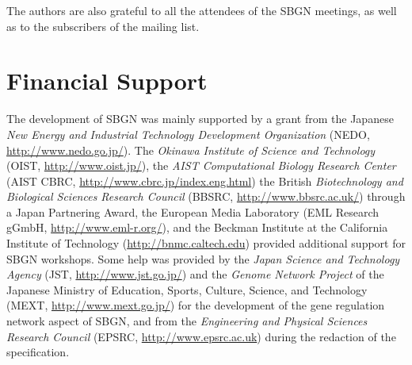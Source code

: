 The authors are also grateful to all the attendees of the SBGN meetings, as 
well as to the subscribers of the  mailing list.


\section{Financial Support}

The development of SBGN was mainly supported by a grant from the Japanese \emph{New Energy and Industrial Technology Development Organization} (NEDO, \url{http://www.nedo.go.jp/}).  The \emph{Okinawa Institute of Science and Technology} (OIST, \url{http://www.oist.jp/}), the \emph{AIST Computational Biology Research Center} (AIST CBRC, \url{http://www.cbrc.jp/index.eng.html}) the British \emph{Biotechnology and Biological Sciences Research Council} (BBSRC, \url{http://www.bbsrc.ac.uk/}) through a Japan Partnering Award, the European Media Laboratory (EML Research gGmbH, \url{http://www.eml-r.org/}), and the Beckman Institute at the California Institute of Technology (\url{http://bnmc.caltech.edu}) provided additional support for SBGN workshops.  Some help was provided by the \emph{Japan Science and Technology Agency} (JST, \url{http://www.jst.go.jp/}) and the \emph{Genome Network Project} of the Japanese Ministry of Education, Sports, Culture, Science, and Technology (MEXT, \url{http://www.mext.go.jp/}) for the development of the gene regulation network aspect of SBGN, and from the \emph{Engineering and Physical Sciences Research Council} (EPSRC, \url{http://www.epsrc.ac.uk}) during the redaction of the specification.
